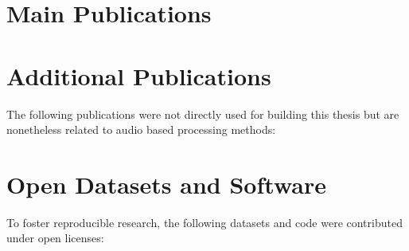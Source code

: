 \newrefcontext[sorting=ynt]
\section*{Main Publications}
\begin{refsection}%
\nocite{*}
\printbibliography[env=numbered+bold, heading=none, sorting=ynt, resetnumbers=true]
\end{refsection}

\section*{Additional Publications}
The following publications were not directly used for building this thesis but are nonetheless related to audio based processing methods:
\begin{refsection}
\nocite{*}
\printbibliography[env=numbered+bold, heading=none,resetnumbers=true, sorting=ynt]
\newrefcontext[sorting=nyt]
\end{refsection}

\section*{Open Datasets and Software}
To foster reproducible research, the following datasets and code were contributed under open licenses:
\begin{refsection}
\nocite{*}
\printbibliography[env=numbered+bold, heading=none,resetnumbers=true, sorting=ynt]
\newrefcontext[sorting=nyt]
\end{refsection}
